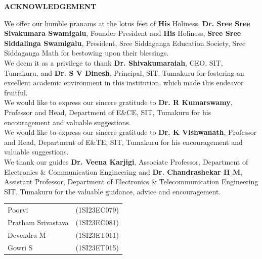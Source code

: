 \begin{titlepage}
\begin{center}
{\Large \textbf{ACKNOWLEDGEMENT}}
\end{center}

We offer our humble pranams at the lotus feet of \textbf{His} Holiness, \textbf{Dr. Sree Sree Sivakumara Swamigalu}, Founder President and \textbf{His} Holiness, \textbf{Sree Sree Siddalinga Swamigalu}, President, Sree Siddaganga Education Society, Sree Siddaganga Math for bestowing upon their blessings.\\

We deem it as a privilege to thank  \textbf{Dr. Shivakumaraiah}, CEO, SIT, Tumakuru,  and \textbf{Dr. S V Dinesh}, Principal, SIT, Tumakuru for fostering an excellent academic environment in this institution, which made this endeavor fruitful.\\

We would like to express our sincere gratitude to \textbf{Dr. R Kumarswamy}, Professor and Head, Department of E\&CE, SIT, Tumakuru for his encouragement and valuable suggestions.\\


We would like to express our sincere gratitude to \textbf{Dr. K Vishwanath}, Professor and Head, Department of E\&TE, SIT, Tumakuru for his encouragement and valuable suggestions.\\

We thank our guides \textbf{Dr. Veena Karjigi}, Associate Professor, Department of Electronics \& Communication Engineering and \textbf{Dr. Chandrashekar H M}, Assistant  Professor, Department of Electronics \& Telecommunication Engineering SIT, Tumakuru for the valuable guidance, advice and encouragement.\\





\begin{flushright}
\begin{tabular}{ll}
Poorvi & (1SI23EC079)  \\
Pratham Srivastava & (1SI23EC081)  \\
Devendra M & (1SI23ET011)  \\
Gowri S & (1SI23ET015)  \\
\end{tabular}\\[1.5cm]
\end{flushright}
\end{titlepage}